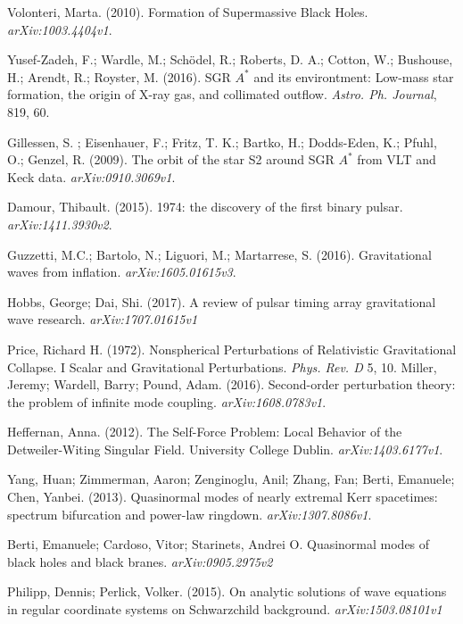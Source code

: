 Volonteri, Marta. (2010). Formation of Supermassive Black Holes. {\em arXiv:1003.4404v1}.

Yusef-Zadeh, F.; Wardle, M.; Sch\"{o}del, R.; Roberts, D. A.; Cotton, W.; Bushouse, H.; Arendt, R.; Royster, M. (2016). SGR $A^*$ and its environtment: Low-mass star formation, the origin of X-ray gas, and collimated outflow. {\em Astro. Ph. Journal}, 819, 60.

Gillessen, S. ; Eisenhauer, F.; Fritz, T. K.; Bartko, H.; Dodds-Eden, K.; Pfuhl, O.; Genzel, R. (2009). The orbit of the star S2 around SGR $A^*$ from VLT and Keck data. {\em arXiv:0910.3069v1}.

Damour, Thibault. (2015). 1974: the discovery of the first binary pulsar. {\em arXiv:1411.3930v2}.

Guzzetti, M.C.; Bartolo, N.; Liguori, M.; Martarrese, S. (2016). Gravitational waves from inflation. {\em arXiv:1605.01615v3}.

Hobbs, George; Dai, Shi. (2017). A review of pulsar timing array gravitational wave research. {\em arXiv:1707.01615v1}

Price, Richard H. (1972). Nonspherical Perturbations of Relativistic Gravitational Collapse. I Scalar and Gravitational Perturbations. {\em Phys. Rev. D} 5, 10. 
Miller, Jeremy; Wardell, Barry; Pound, Adam. (2016). Second-order perturbation theory: the problem of infinite mode coupling. {\em arXiv:1608.0783v1}.

Heffernan, Anna. (2012). The Self-Force Problem: Local Behavior of the Detweiler-Witing Singular Field. University College Dublin. {\em arXiv:1403.6177v1}.

Yang, Huan; Zimmerman, Aaron; Zenginoglu, Anil; Zhang, Fan; Berti, Emanuele; Chen, Yanbei. (2013). Quasinormal modes of nearly extremal Kerr spacetimes: spectrum bifurcation and power-law ringdown. {\em arXiv:1307.8086v1}.

Berti, Emanuele; Cardoso, Vitor; Starinets, Andrei O. Quasinormal modes of black holes and black branes. {\em arXiv:0905.2975v2}

Philipp, Dennis; Perlick, Volker. (2015). On analytic solutions of wave equations in regular coordinate systems on Schwarzchild background. {\em arXiv:1503.08101v1} 


